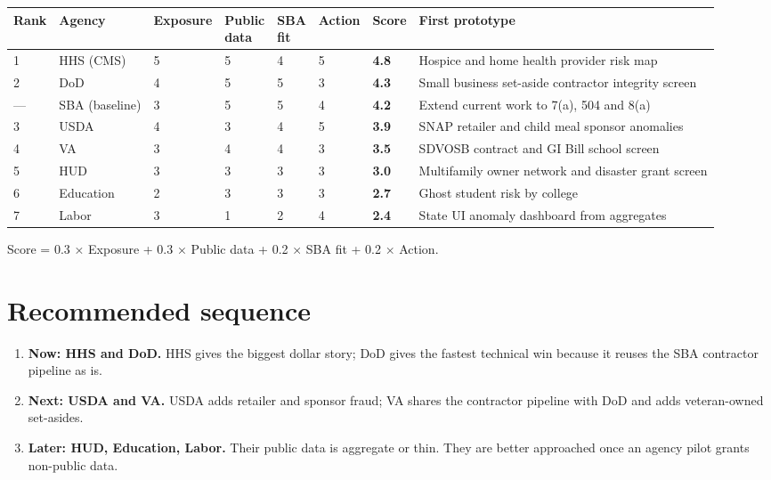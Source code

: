 \documentclass[letterpaper,11pt]{article}
\providecommand{\tightlist}{\setlength{\itemsep}{0pt}\setlength{\parskip}{0pt}}
\begin{document}
\begingroup\footnotesize\setlength{\tabcolsep}{4pt}\renewcommand{\arraystretch}{1.25}
\begin{longtable}[l]{@{}l>{\raggedright\arraybackslash}p{}lllll>{\raggedright\arraybackslash}p{}@{}}
\rowcolor{coolblack}\leavevmode\color{white}\bfseries Rank & \leavevmode\color{white}\bfseries Agency & \leavevmode\color{white}\bfseries Exposure & \leavevmode\color{white}\bfseries \makecell[tl]{Public\\data} & \leavevmode\color{white}\bfseries \makecell[tl]{SBA\\fit} & \leavevmode\color{white}\bfseries Action & \leavevmode\color{white}\bfseries Score & \leavevmode\color{white}\bfseries First prototype \\
\endhead
1 & HHS (CMS) & 5 & 5 & 4 & 5 & \textbf{4.8} & Hospice and home health provider risk map \\
2 & DoD & 4 & 5 & 5 & 3 & \textbf{4.3} & Small business set-aside contractor integrity screen \\
--- & SBA (baseline) & 3 & 5 & 5 & 4 & \textbf{4.2} & Extend current work to 7(a), 504 and 8(a) \\
3 & USDA & 4 & 3 & 4 & 5 & \textbf{3.9} & SNAP retailer and child meal sponsor anomalies \\
4 & VA & 3 & 4 & 4 & 3 & \textbf{3.5} & SDVOSB contract and GI Bill school screen \\
5 & HUD & 3 & 3 & 3 & 3 & \textbf{3.0} & Multifamily owner network and disaster grant screen \\
6 & Education & 2 & 3 & 3 & 3 & \textbf{2.7} & Ghost student risk by college \\
7 & Labor & 3 & 1 & 2 & 4 & \textbf{2.4} & State UI anomaly dashboard from aggregates \\
\end{longtable}\endgroup

Score = 0.3 × Exposure + 0.3 × Public data + 0.2 × SBA fit + 0.2 ×
Action.

\hypertarget{recommended-sequence}{%
\section{Recommended sequence}\label{recommended-sequence}}

\begin{enumerate}
\def\labelenumi{\arabic{enumi}.}
\tightlist
\item
  \textbf{Now: HHS and DoD.} HHS gives the biggest dollar story; DoD
  gives the fastest technical win because it reuses the SBA contractor
  pipeline as is.
\item
  \textbf{Next: USDA and VA.} USDA adds retailer and sponsor fraud; VA
  shares the contractor pipeline with DoD and adds veteran-owned
  set-asides.
\item
  \textbf{Later: HUD, Education, Labor.} Their public data is aggregate
  or thin. They are better approached once an agency pilot grants
  non-public data.
\end{enumerate}
\end{document}
